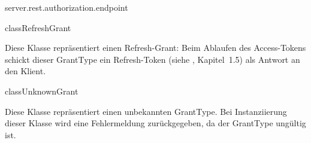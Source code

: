 \begin{texdocpackage}{server.rest.authorization.endpoint}
\begin{texdocclass}{class}{RefreshGrant}
\label{texdoclet:edu.kit.informatik.studyplan.server.rest.authorization.endpoint.RefreshGrant}
\begin{texdocclassintro}
Diese Klasse repräsentiert einen Refresh-Grant: Beim Ablaufen des Access-Tokens schickt dieser GrantType
 ein Refresh-Token (siehe \cite{rfc6749}, Kapitel~1.5) als Antwort an den Klient.\end{texdocclassintro}
\begin{texdocclassconstructors}
\end{texdocclassconstructors}
\begin{texdocclassmethods}
\end{texdocclassmethods}
\end{texdocclass}


\begin{texdocclass}{class}{UnknownGrant}
\label{texdoclet:edu.kit.informatik.studyplan.server.rest.authorization.endpoint.UnknownGrant}
\begin{texdocclassintro}
Diese Klasse repräsentiert einen unbekannten GrantType. Bei Instanziierung dieser Klasse wird 
eine Fehlermeldung zurückgegeben, da der GrantType ungültig ist.\end{texdocclassintro}
\begin{texdocclassconstructors}
\end{texdocclassconstructors}
\begin{texdocclassmethods}
\end{texdocclassmethods}
\end{texdocclass}


\end{texdocpackage}



